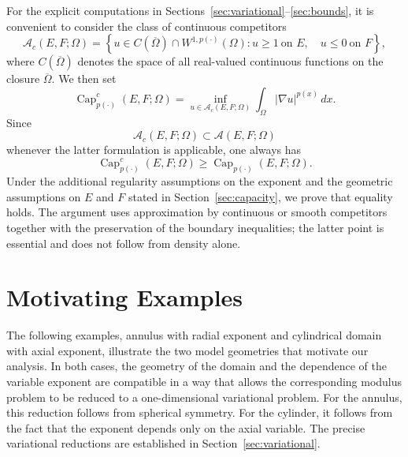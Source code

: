 \documentclass[12pt]{amsart}
\numberwithin{equation}{section}
\theoremstyle{plain}
\theoremstyle{definition}
\begin{document}
For the explicit computations in
Sections~\ref{sec:variational}--\ref{sec:bounds}, it is convenient to
consider the class of continuous competitors
\begin{equation*}
\mathcal A_c(E,F;\Omega)
=
\left\{
u\in C(\overline{\Omega})\cap W^{1,p(\cdot)}(\Omega):
u\ge1\ \text{on }E,\quad
u\le0\ \text{on }F
\right\},
\end{equation*}
where $C(\overline{\Omega})$ denotes the space of all real-valued
continuous functions on the closure $\overline{\Omega}$.
We then set
\begin{equation*}
\operatorname{Cap}_{p(\cdot)}^c(E,F;\Omega)
=
\inf_{u\in\mathcal A_c(E,F;\Omega)}
\int_\Omega|\nabla u|^{p(x)}\,dx.
\end{equation*}
Since
\begin{equation*}
\mathcal A_c(E,F;\Omega)
\subset \mathcal A(E,F;\Omega)
\end{equation*}
whenever the latter formulation is applicable, one always has
\begin{equation*}
\operatorname{Cap}_{p(\cdot)}^c(E,F;\Omega)
\ge
\operatorname{Cap}_{p(\cdot)}(E,F;\Omega).
\end{equation*}
Under the additional regularity assumptions on the exponent and the
geometric assumptions on $E$ and $F$ stated in
Section~\ref{sec:capacity}, we prove that equality holds. The argument
uses approximation by continuous or smooth competitors together with
the preservation of the boundary inequalities; the latter point is
essential and does not follow from density alone.


\section{Motivating Examples}\label{sec:examples}

The following examples, annulus with radial exponent and cylindrical domain with axial exponent, illustrate the two model geometries that
motivate our analysis. In both cases, the geometry of the domain and
the dependence of the variable exponent are compatible in a way that
allows the corresponding modulus problem to be reduced to a
one-dimensional variational problem. For the annulus, this reduction
follows from spherical symmetry. For the cylinder, it follows from the
fact that the exponent depends only on the axial variable. The precise
variational reductions are established in
Section~\ref{sec:variational}.
\end{document}
